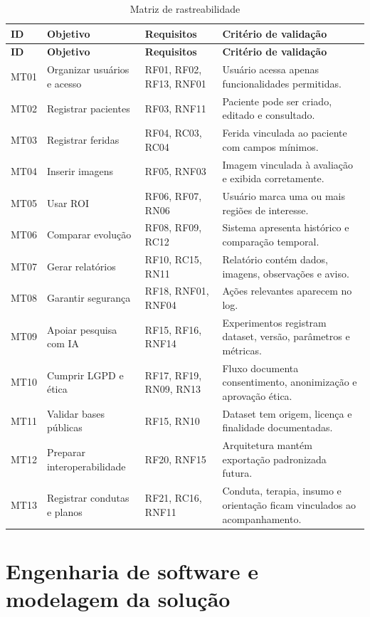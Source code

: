 \documentclass[
    12pt,
    oneside,
    a4paper,
    chapter=TITLE,
    brazil,
    sumario=tradicional,
    hidelinks
]{abntex2}
\begin{document}
\begin{longtable}{L{1.6cm}L{3.2cm}L{3.0cm}L{4.7cm}}
\caption{\label{tab:rastreabilidade}Matriz de rastreabilidade}\\
\toprule
\textbf{ID} & \textbf{Objetivo} & \textbf{Requisitos} & \textbf{Critério de validação} \\
\midrule
\endfirsthead
\toprule
\textbf{ID} & \textbf{Objetivo} & \textbf{Requisitos} & \textbf{Critério de validação} \\
\midrule
\endhead
MT01 & Organizar usuários e acesso & RF01, RF02, RF13, RNF01 & Usuário acessa apenas funcionalidades permitidas. \\
MT02 & Registrar pacientes & RF03, RNF11 & Paciente pode ser criado, editado e consultado. \\
MT03 & Registrar feridas & RF04, RC03, RC04 & Ferida vinculada ao paciente com campos mínimos. \\
MT04 & Inserir imagens & RF05, RNF03 & Imagem vinculada à avaliação e exibida corretamente. \\
MT05 & Usar ROI & RF06, RF07, RN06 & Usuário marca uma ou mais regiões de interesse. \\
MT06 & Comparar evolução & RF08, RF09, RC12 & Sistema apresenta histórico e comparação temporal. \\
MT07 & Gerar relatórios & RF10, RC15, RN11 & Relatório contém dados, imagens, observações e aviso. \\
MT08 & Garantir segurança & RF18, RNF01, RNF04 & Ações relevantes aparecem no log. \\
MT09 & Apoiar pesquisa com IA & RF15, RF16, RNF14 & Experimentos registram dataset, versão, parâmetros e métricas. \\
MT10 & Cumprir LGPD e ética & RF17, RF19, RN09, RN13 & Fluxo documenta consentimento, anonimização e aprovação ética. \\
MT11 & Validar bases públicas & RF15, RN10 & Dataset tem origem, licença e finalidade documentadas. \\
MT12 & Preparar interoperabilidade & RF20, RNF15 & Arquitetura mantém exportação padronizada futura. \\
MT13 & Registrar condutas e planos & RF21, RC16, RNF11 & Conduta, terapia, insumo e orientação ficam vinculados ao acompanhamento. \\
\bottomrule
\end{longtable}

\chapter{Engenharia de software e modelagem da solução}
\end{document}
